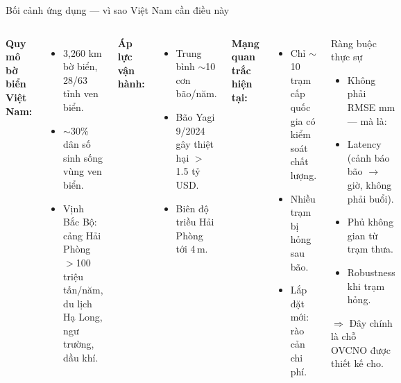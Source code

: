 \documentclass[11pt,aspectratio=169]{beamer}
\begin{document}
\begin{frame}{Bối cảnh ứng dụng --- vì sao Việt Nam cần điều này}
  \small
  \begin{columns}[T]
      \textbf{Quy mô bờ biển Việt Nam:}
      \begin{itemize}\itemsep1pt
        \item \alert{3{,}260 km} bờ biển, 28/63 tỉnh ven biển.
        \item $\sim$30\% dân số sinh sống vùng ven biển.
        \item Vịnh Bắc Bộ: cảng Hải Phòng \alert{$>$100 triệu tấn/năm}, du lịch Hạ Long, ngư trường, dầu khí.
      \end{itemize}

      \vspace{4pt}
      \textbf{Áp lực vận hành:}
      \begin{itemize}\itemsep1pt
        \item Trung bình \alert{$\sim$10 cơn bão/năm}.
        \item Bão Yagi 9/2024 gây thiệt hại \alert{$>$1.5 tỷ USD}.
        \item Biên độ triều Hải Phòng tới 4\,m.
      \end{itemize}

      \textbf{Mạng quan trắc hiện tại:}
      \begin{itemize}\itemsep1pt
        \item Chỉ \alert{$\sim$10 trạm cấp quốc gia} có kiểm soát chất lượng.
        \item Nhiều trạm bị hỏng sau bão.
        \item Lắp đặt mới: rào cản chi phí.
      \end{itemize}

      \vspace{4pt}
      \begin{block}{Ràng buộc thực sự}
        \begin{itemize}\itemsep1pt
          \item Không phải RMSE \alert{mm} --- mà là:
          \item \alert{Latency} (cảnh báo bão $\to$ giờ, không phải buổi).
          \item \alert{Phủ không gian} từ trạm thưa.
          \item \alert{Robustness} khi trạm hỏng.
        \end{itemize}
        \vspace{2pt}
        $\Rightarrow$ Đây chính là chỗ OVCNO được thiết kế cho.
      \end{block}
  \end{columns}
\end{frame}
\end{document}

